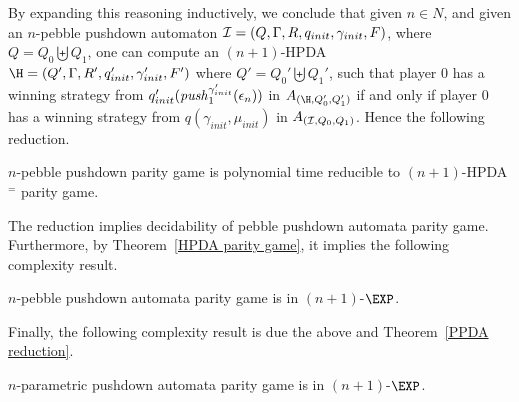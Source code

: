 {By expanding this reasoning inductively, we conclude that given $n \in N$, and
given an $n$-pebble pushdown automaton 
$\mathcal{I} = (Q, \Gamma, R, q_{init}, \gamma_{init}, F)$, where $Q= Q_0 \biguplus Q_1$,
one can compute an $(n+1)$-HPDA 
$\H = (Q', \Gamma, R', q_{init}', \gamma_{init}', F')$  where $Q'= Q_0' \biguplus Q_1'$, 
such 
that 
player $0$ has a winning strategy from $q'_{init}(\text{\textit{push}}_1^{\gamma_{init}'}(\epsilon_{n}))$ in $A_{(\H,Q'_0,Q'_1)}$ 
if
and only if
player $0$ has a winning strategy from $q(\gamma_{init},\mu_{init})$ in $A_{(\mathcal{I},Q_0,Q_1)}$. 
Hence the following reduction.

\begin{theorem} 
{\sc $n$-pebble pushdown parity game} is polynomial time reducible
to {\sc $(n+1)$-HPDA$^=$ parity game}.
\end{theorem}

The reduction implies decidability of pebble pushdown automata parity game. Furthermore,
by Theorem~\ref{HPDA parity game}, it implies the following complexity result.


\begin{theorem}
{\sc $n$-pebble pushdown automata parity game} is in $(n+1)$-$\EXP$.
\end{theorem}

Finally, the following complexity result is due the above and Theorem~\ref{PPDA reduction}.

\begin{corollary}
{\sc $n$-parametric pushdown automata parity game} is in $(n+1)$-$\EXP$.
\end{corollary}





































}

